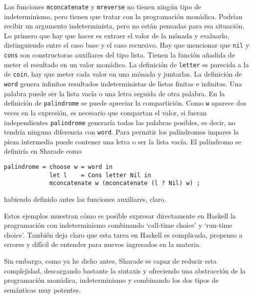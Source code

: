 \documentclass[class=article, crop=false]{standalone}
\begin{document}
Las funciones \verb`mconcatenate` y \verb`mreverse` no tienen ningún tipo de indeterminismo,
pero tienen que tratar con la programación monádica. Podrían recibir un argumento
indeterminista, pero no están pensadas para esa situación. Lo primero que hay que hacer es
extraer el valor de la mónada y evaluarlo, distinguiendo entre el caso base y el caso
recursivo. Hay que mencionar que \verb`nil` y \verb`cons` son constructoras auxiliares del
tipo lista. Tienen la función añadida de meter el resultado en un valor monádico. La
definición de \verb`letter` es parecida a la de \verb`coin`, hay que meter cada valor en una
mónada y juntarlas. La definición de \verb`word` genera infinitos resultados indeterministas
de listas finitas e infinitas. Una palabra puede ser la lista vacía o una letra seguida de
otra palabra. En la definición de \verb`palindrome` se puede apreciar la compartición. Como
\verb`w` aparece dos veces en la expresión, es necesario que compartan el valor, si fueran
independientes \verb`palindrome` generaría todas las palabras posibles, es decir, no tendría
ninguna diferencia con \verb`word`. Para permitir los palíndromos impares la pieza intermedia
puede contener una letra o ser la lista vacía. El palíndromo se definiría en Sharade como
\begin{verbatim}
palindrome = choose w = word in
             let l    = Cons letter Nil in
             mconcatenate w (mconcatenate (l ? Nil) w) ;
\end{verbatim}
habiendo definido antes las funciones auxiliares, claro.

Estos ejemplos muestran cómo es posible expresar directamente en Haskell la programación con
indeterminismo combinando `call-time choice' y `run-time choice'. También deja claro que esta
tarea en Haskell es complicada, propenso a errores y difícil de entender para nuevos
ingresados en la materia.

Sin embargo, como ya he dicho antes, Sharade es capaz de reducir esta complejidad,
descargando bastante la sintaxis y ofreciendo una abstracción de la programación monádica,
indeterminismo y combinando los dos tipos de semánticas muy potentes.
\end{document}
